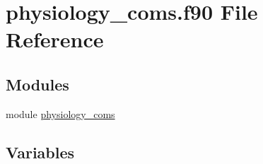 \hypertarget{physiology__coms_8f90}{}\section{physiology\+\_\+coms.\+f90 File Reference}
\label{physiology__coms_8f90}
\subsection*{Modules}
\begin{DoxyCompactItemize}
\item 
module \hyperlink{namespacephysiology__coms}{physiology\+\_\+coms}
\end{DoxyCompactItemize}
\subsection*{Variables}
